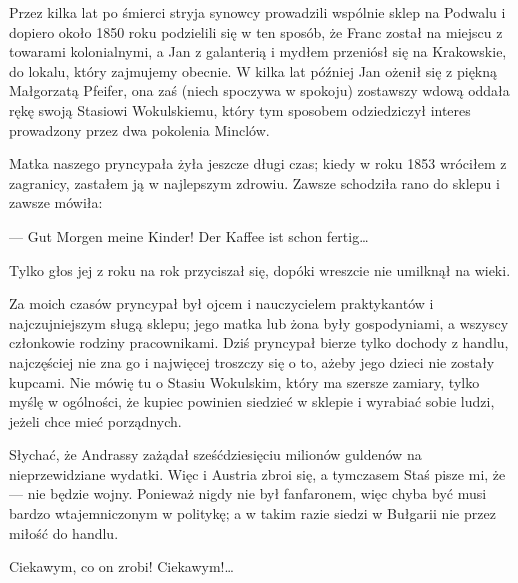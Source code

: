 \documentclass{book}
\begin{document}
Przez kilka lat po śmierci stryja synowcy prowadzili wspólnie sklep na Podwalu i dopiero około 1850 roku podzielili się w ten sposób, że Franc został na miejscu z towarami kolonialnymi, a Jan z galanterią i mydłem przeniósł się na Krakowskie, do lokalu, który zajmujemy obecnie. W kilka lat później Jan ożenił się z piękną Małgorzatą Pfeifer, ona zaś (niech spoczywa w spokoju) zostawszy wdową oddała rękę swoją Stasiowi Wokulskiemu, który tym sposobem odziedziczył interes prowadzony przez dwa pokolenia Minclów.

Matka naszego pryncypała żyła jeszcze długi czas; kiedy w roku 1853 wróciłem z zagranicy, zastałem ją w najlepszym zdrowiu. Zawsze schodziła rano do sklepu i zawsze mówiła:

— Gut Morgen meine Kinder! Der Kaffee ist schon fertig…

Tylko głos jej z roku na rok przyciszał się, dopóki wreszcie nie umilknął na wieki.

Za moich czasów pryncypał był ojcem i nauczycielem praktykantów i najczujniejszym sługą sklepu; jego matka lub żona były gospodyniami, a wszyscy członkowie rodziny pracownikami. Dziś pryncypał bierze tylko dochody z handlu, najczęściej nie zna go i najwięcej troszczy się o to, ażeby jego dzieci nie zostały kupcami. Nie mówię tu o Stasiu Wokulskim, który ma szersze zamiary, tylko myślę w ogólności, że kupiec powinien siedzieć w sklepie i wyrabiać sobie ludzi, jeżeli chce mieć porządnych.

Słychać, że Andrassy zażądał sześćdziesięciu milionów guldenów na nieprzewidziane wydatki. Więc i Austria zbroi się, a tymczasem Staś pisze mi, że — nie będzie wojny. Ponieważ nigdy nie był fanfaronem, więc chyba być musi bardzo wtajemniczonym w politykę; a w takim razie siedzi w Bułgarii nie przez miłość do handlu.

Ciekawym, co on zrobi! Ciekawym!…
\end{document}
